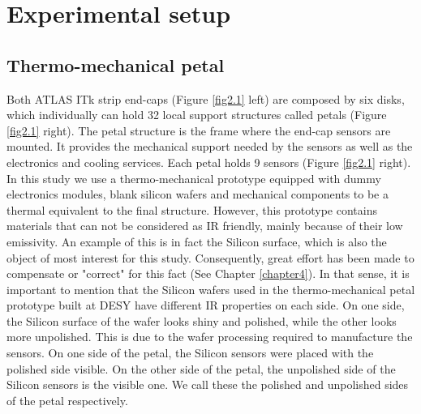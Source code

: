 \pagestyle{standard}

\chapter{Experimental setup}\label{chapter2}

	\thispagestyle{chapter-first-page}
	
	\section{Thermo-mechanical petal}\label{section2.1}
	
		Both ATLAS ITk strip end-caps (Figure \ref{fig2.1} left) are composed by six disks, which individually can hold 32 local support structures called petals (Figure \ref{fig2.1} right). The petal structure is the frame where the end-cap sensors are mounted. It provides the mechanical support needed by the sensors as well as the electronics and cooling services. Each petal holds 9 sensors (Figure \ref{fig2.1} right). 
		In this study we use a thermo-mechanical prototype equipped with dummy electronics modules, blank silicon wafers and mechanical components to be a thermal equivalent to the final structure. However, this prototype contains materials that can not be considered as IR friendly, mainly because of their low emissivity. An example of this is in fact the Silicon surface, which is also the object of most interest for this study. Consequently, great effort has been made to compensate or "correct" for this fact (See Chapter \ref{chapter4}). In that sense, it is important to mention that the Silicon wafers used in the thermo-mechanical petal prototype built at DESY have different IR properties on each side. On one side, the Silicon surface of the wafer looks shiny and polished, while the other looks more unpolished. This is due to the wafer processing required to manufacture the sensors.
		On one side of the petal, the Silicon sensors were placed with the polished side visible. On the other side of the petal, the unpolished side of the Silicon sensors is the visible one. We call these the polished and unpolished sides of the petal respectively.
				
